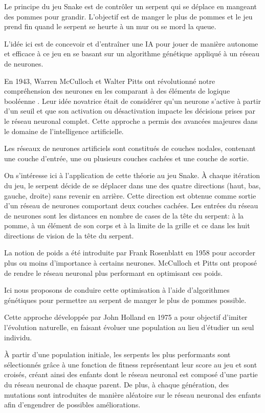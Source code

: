 \documentclass[11pt,a4paper]{article}
\begin{document}
Le principe du jeu Snake est de contrôler un serpent qui se déplace en mangeant des pommes pour grandir.
L'objectif est de manger le plus de pommes et le jeu prend fin quand le serpent se heurte à un mur ou se mord la queue.

L'idée ici est de concevoir et d'entraîner une IA pour jouer de manière autonome et efficace à ce jeu en se basant sur un algorithme génétique appliqué à un réseau de neurones.

En 1943, Warren McCulloch et Walter Pitts ont révolutionné notre compréhension des neurones en les comparant à des éléments de logique booléenne \cite{reseauNeuronesIBM}. 
Leur idée novatrice était de considérer qu’un neurone s’active à partir d’un seuil et que son activation ou désactivation impacte les décisions prises par le réseau neuronal complet. Cette approche a permis des avancées majeures dans le domaine de l'intelligence artificielle.

Les réseaux de neurones artificiels sont constitués de couches nodales, contenant une couche d'entrée, une ou plusieurs couches cachées et une couche de sortie. 

On s’intéresse ici à l’application de cette théorie au jeu Snake.
À chaque itération du jeu, le serpent décide de se déplacer dans une des quatre directions (haut, bas, gauche, droite) sans revenir en arrière. 
Cette direction est obtenue comme sortie d’un réseau de neurones comportant deux couches cachées.
Les entrées du réseau de neurones sont les distances en nombre de cases de la tête du serpent: à la pomme, à un élément de son corps et à la limite de la grille et ce dans les huit directions de vision de la tête du serpent.

La notion de poids a été introduite par Frank Rosenblatt en 1958 \cite{reseauNeuronesIBM} pour accorder plus ou moins d'importance à certains neurones.
McCulloch et Pitts ont proposé de rendre le réseau neuronal plus performant en optimisant ces poids. 

Ici nous proposons de conduire cette optimisation à l’aide d’algorithmes génétiques \cite{poli2008field,whitley1994geneticAlgorithmTutorial} pour permettre au serpent de manger le plus de pommes possible.

Cette approche développée par John Holland en 1975 \cite{holland1992adaptation} a pour objectif d'imiter l'évolution naturelle, en faisant évoluer une population au lieu d’étudier un seul individu.

À partir d’une population initiale, les serpents les plus performants sont sélectionnés grâce à une fonction de fitness représentant leur score au jeu et sont croisés, créant ainsi des enfants dont le réseau neuronal est composé d'une partie du réseau neuronal de chaque parent.
De plus, à chaque génération, des mutations sont introduites de manière aléatoire sur le réseau neuronal des enfants afin d'engendrer de possibles améliorations.
\end{document}

